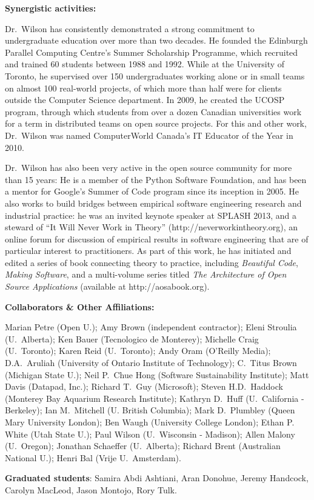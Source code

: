 \documentclass{proposalnsf}
\newlength{\up}
\begin{document}
\pagebreak

\textbf{Synergistic activities:} %

Dr.\ Wilson has consistently demonstrated a strong commitment to undergraduate education over more than two decades.
He founded the Edinburgh Parallel Computing Centre's Summer Scholarship Programme,
which recruited and trained 60 students between 1988 and 1992.
While at the University of Toronto,
he supervised over 150 undergraduates working alone or in small teams on almost 100 real-world projects,
of which more than half were for clients outside the Computer Science department.
In 2009, he created the UCOSP program,
through which students from over a dozen Canadian universities work for a term in distributed teams on open source projects.
For this and other work,
Dr.\ Wilson was named ComputerWorld Canada's IT Educator of the Year in 2010.

Dr.\ Wilson has also been very active in the open source community for more than 15 years:
He is a member of the Python Software Foundation,
and has been a mentor for Google's Summer of Code program since its inception in 2005.
He also works to build bridges between empirical software engineering research and industrial practice:
he was an invited keynote speaker at SPLASH 2013,
and a steward of ``It Will Never Work in Theory'' (http://neverworkintheory.org),
an online forum for discussion of empirical results in software engineering
that are of particular interest to practitioners.
As part of this work,
he has initiated and edited a series of book connecting theory to practice,
including \emph{Beautiful Code}, \emph{Making Software},
and a multi-volume series titled \emph{The Architecture of Open Source Applications}
(available at http://aosabook.org).

\textbf{Collaborators \& Other Affiliations:} %

Marian Petre (Open U.);
Amy Brown (independent contractor);
Eleni Stroulia (U.\ Alberta);
Ken Bauer (Tecnologico de Monterey);
Michelle Craig (U.\ Toronto);
Karen Reid (U.\ Toronto);
Andy Oram (O'Reilly Media);
D.A.\ Aruliah (University of Ontario Institute of Technology);
C.\ Titus Brown (Michigan State U.);
Neil P.\ Chue Hong (Software Sustainability Institute);
Matt Davis (Datapad, Inc.);
Richard T.\ Guy (Microsoft);
Steven H.D.\ Haddock (Monterey Bay Aquarium Research Institute);
Kathryn D.\ Huff (U.\ California - Berkeley);
Ian M.\ Mitchell (U. British Columbia);
Mark D.\ Plumbley (Queen Mary University London);
Ben Waugh (University College London);
Ethan P. White (Utah State U.);
Paul Wilson (U.\ Wisconsin - Madison);
Allen Malony (U.\ Oregon);
Jonathan Schaeffer (U.\ Alberta);
Richard Brent (Australian National U.);
Henri Bal (Vrije U.\ Amsterdam).

\textbf{Graduated students}: Samira Abdi Ashtiani, Aran Donohue, Jeremy Handcock, Carolyn MacLeod, Jason Montojo, Rory Tulk.
\end{document}
